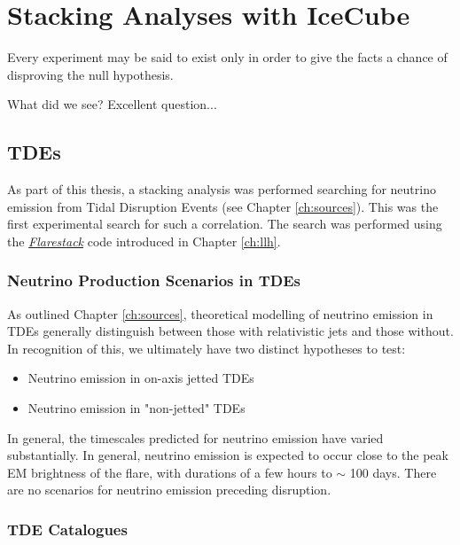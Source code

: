 \setchapterpreamble[u]{\margintoc}
\chapter{Stacking Analyses with IceCube}
\begin{fquote}Every experiment may be said to exist only in order to give the facts a chance of disproving the null hypothesis.
\end{fquote}


What did we see? Excellent question...

\section{TDEs}

As part of this thesis, a stacking analysis was performed searching for neutrino emission from Tidal Disruption Events (see Chapter \ref{ch:sources}). This was the first experimental search for such a correlation. The search was performed using the \emph{\href{https://github.com/IceCubeOpenSource/flarestack}{Flarestack}} code introduced in Chapter \ref{ch:llh}.

\subsection{Neutrino Production Scenarios in TDEs}

As outlined Chapter \ref{ch:sources}, theoretical modelling of neutrino emission in TDEs generally distinguish between those with relativistic jets and those without. In recognition of this, we ultimately have two distinct hypotheses to test:

\begin{itemize}
	\item Neutrino emission in on-axis jetted TDEs
	\item Neutrino emission in "non-jetted" TDEs
\end{itemize}

In general, the timescales predicted for neutrino emission have varied substantially. In general, neutrino emission is expected to occur close to the peak EM brightness of the flare, with durations of a few hours to $\sim$ 100 days. There are no scenarios for neutrino emission preceding disruption. 

\subsection{TDE Catalogues}

